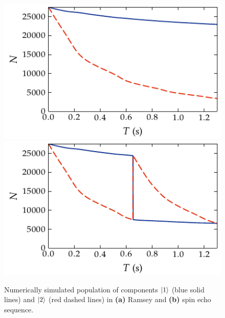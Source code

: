 \begin{figure}
    \centerline{%
    \includegraphics{figures_generated/bec_noise/ramsey_single_run_pop.pdf}%
    \includegraphics{figures_generated/bec_noise/echo_single_run_pop.pdf}}

    \caption{Numerically simulated population of components $\mbox{\ensuremath{\vert 1 \rangle}}$ (blue solid lines) and $\mbox{\ensuremath{\vert 2 \rangle}}$ (red dashed lines) in \textbf{(a)} Ramsey and \textbf{(b)} spin echo sequence.}

    \label{fig:bec-noise:visibility:population}
\end{figure}

